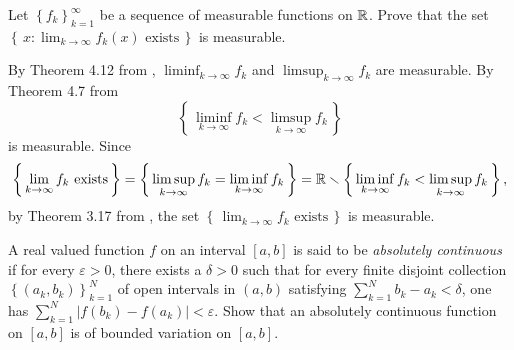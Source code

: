 \begin{problem}
  Let $\left\{f_k\right\}_{k=1}^\infty$ be a sequence of measurable
  functions on $\mathbb{R}$. Prove that the set
  $\left\{\,x:\text{$\lim_{k\to\infty} f_k(x)$ exists}\,\right\}$ is
  measurable.
\end{problem}
\begin{solution}
  By Theorem 4.12 from \cite[Ch.\@ 4, p.\@ 67]{wheeden-zygmund},
  $\liminf_{k\to\infty}f_k$ and $\limsup_{k\to\infty}f_k$ are
  measurable. By Theorem 4.7 from \cite[Ch.\@ 4, p.\@ 66]{wheeden-zygmund}
  \begin{equation}
    \label{eq:prep:1:12}
    \left\{\,\liminf_{k\to\infty} f_k<\limsup_{k\to\infty} f_k\,\right\}
  \end{equation}
  is measurable. Since
  \begin{equation}
    \label{eq:prep:1:13}
    \left\{\,\text{$\lim_{k\to\infty}f_k$ exists}\,\right\}=
    \left\{\,{\limsup_{k\to\infty}f_k=\liminf_{k\to\infty}f_k}\,\right\}=
    \mathbb{R}\smallsetminus
    \left\{\,{\liminf_{k\to\infty} f_k<\limsup_{k\to\infty} f_k}\,\right\},
  \end{equation}
  by Theorem 3.17 from \cite[Ch.\@ 3, p.\@ 48]{wheeden-zygmund}, the set
  $\left\{\,\text{$\lim_{k\to\infty}f_k$ exists}\,\right\}$ is measurable.
\end{solution}
\begin{problem}
  A real valued function $f$ on an interval $[a,b]$ is said to be
  \emph{absolutely continuous} if for every $\varepsilon>0$, there exists a
  $\delta>0$ such that for every finite disjoint collection
  $\left\{(a_k,b_k)\right\}_{k=1}^N$ of open intervals in $(a,b)$
  satisfying $\sum_{k=1}^Nb_k-a_k<\delta$, one has
  $\sum_{k=1}^N\left|f(b_k)-f(a_k)\right|<\varepsilon$. Show that an
  absolutely continuous function on $[a,b]$ is of bounded variation on
  $[a,b]$.
\end{problem}
